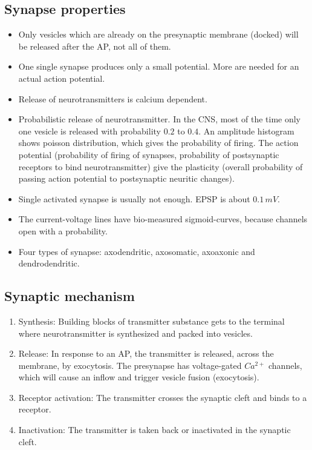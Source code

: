 \documentclass[main]{subfiles}
\begin{document}
\subsection{Synapse properties}
\begin{itemize}[noitemsep,nolistsep]
	\item Only vesicles which are already on the presynaptic membrane (docked) will be released after the AP, not all of them.
	\item One single synapse produces only a small potential. More are needed for an actual action potential.
	\item Release of neurotransmitters is calcium dependent.
	\item Probabilistic release of neurotransmitter.
	\subitem In the CNS, most of the time only one vesicle is released with probability $0.2$ to $0.4$.
	\subitem An amplitude histogram shows poisson distribution, which gives the probability of firing.
	\subitem The action potential (probability of firing of synapses, probability of postsynaptic receptors to bind neurotransmitter) give the plasticity (overall probability of passing action potential to postsynaptic neuritic changes).
	\item Single activated synapse is usually not enough. EPSP is about $0.1\,mV$.
	\item The current-voltage lines have bio-measured sigmoid-curves, because channels open with a probability.
	\item Four types of synapse: axodendritic, axosomatic, axoaxonic and dendrodendritic.
\end{itemize}

\subsection{Synaptic mechanism}
\begin{enumerate}
	\item Synthesis: Building blocks of transmitter substance gets to the terminal where neurotransmitter is synthesized and packed into vesicles.
	\item Release: In response to an AP, the transmitter is released, across the membrane, by exocytosis. The presynapse has voltage-gated $Ca^{2+}$ channels, which will cause an inflow and trigger vesicle fusion (exocytosis).
	\item Receptor activation: The transmitter crosses the synaptic cleft and binds to a receptor.
	\item Inactivation: The transmitter is taken back or inactivated in the synaptic cleft.
\end{enumerate}
\end{document}
